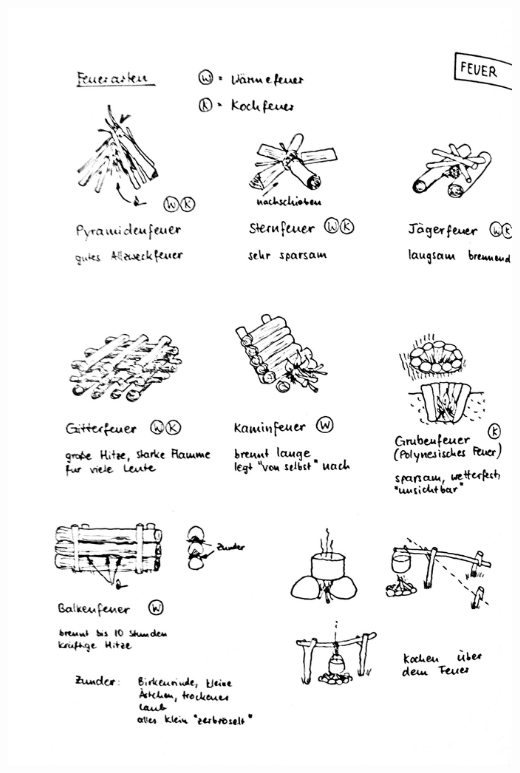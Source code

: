 \includegraphics[width=\textwidth,height=\textheight,keepaspectratio]{Ausgaben/Sola24/Grafiken/Feuer.jpg}